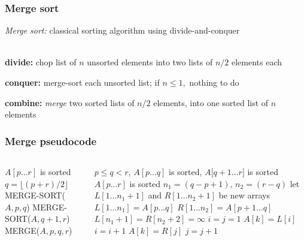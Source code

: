 \documentclass{beamer}
\newcommand{\stanza}{ \\~\ }
\begin{document}
\begin{frame} \frametitle{Merge sort}
  \emph{Merge sort:} classical sorting algorithm using divide-and-conquer \stanza

  \textbf{divide:} chop list of $n$ unsorted elements into two lists of $n/2$
    elements each

  \textbf{conquer:} merge-sort each unsorted list; if $n \leq 1,$ nothing to do

  \textbf{combine:} \emph{merge} two sorted lists of $n/2$ elements, into one
    sorted list of $n$ elements

\end{frame}

\begin{frame} \frametitle{Merge pseudocode}

  \begin{columns}
  \begin{column}{0.4\textwidth}
    {\tiny
      \begin{algorithmic}[1]
        \Ensure $A[p \ldots r]$ is sorted
          \State $q = \lfloor (p+r) / 2 \rfloor$
          \State MERGE-SORT($A, p, q$)
          \State MERGE-SORT($A, q+1, r$)
          \State MERGE($A, p, q, r$)
        \EndIf
      \end{algorithmic}
    }
\end{column}
\begin{column}{0.6\textwidth}

    {\tiny
    \begin{algorithmic}[1]
      \Require $p \leq q < r$, $A[p \ldots q]$ is sorted, $A[q+1 \ldots r$] is sorted
      \Ensure $A[p \ldots r]$ is sorted
      \State $n_1 = (q-p+1), \, n_2 = (r-q)$
      \State let $L[1 \ldots n_1+1]$ and $R[1 \ldots n_2 + 1]$ be new arrays
      \State $L[1 \ldots n_1] = A[p \ldots q]$
      \State $R[1 \ldots n_2] = A[p+1 \ldots q]$
      \State $L[n_1+1] = R[n_2+2] = \infty$
      \State $i = j = 1$
              \State $A[k] = L[i]$
              \State $i = i + 1$
          \Else
              \State $A[k] = R[j]$
              \State $j = j + 1$
          \EndIf
      \EndFor
    \end{algorithmic}
    }

\end{column}
\end{columns}
\end{frame}
\end{document}
